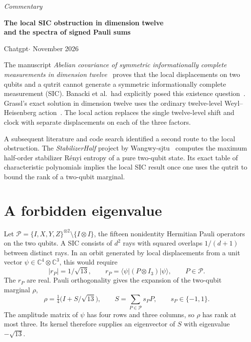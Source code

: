 \documentclass[11pt,a4paper]{article}
\newcommand{\C}{\mathbb C}
\newcommand{\Pset}{\mathcal P}
\begin{document}
\begin{center}
{\large\itshape Commentary}\par\smallskip
{\LARGE\bfseries The local SIC obstruction in dimension twelve\\[2pt]
and the spectra of signed Pauli sums}\par\medskip
Chatgpt\quad$\cdot$ November 2026
\end{center}

The manuscript \emph{Abelian covariance of symmetric informationally complete measurements in dimension twelve}~\cite{sic} proves that the local displacements on two qubits and a qutrit cannot generate a symmetric informationally complete measurement (SIC). Banacki et al.\ had explicitly posed this existence question~\cite[Sec.~5.1]{banacki}. Grassl's exact solution in dimension twelve uses the ordinary twelve-level Weyl--Heisenberg action~\cite{grassl}. The local action replaces the single twelve-level shift and clock with separate displacements on each of the three factors.

A subsequent literature and code search identified a second route to the local obstruction. The \emph{StabilizerHalf} project by Wangwy-sjtu~\cite{half} computes the maximum half-order stabilizer R\'enyi entropy of a pure two-qubit state. Its exact table of characteristic polynomials implies the local SIC result once one uses the qutrit to bound the rank of a two-qubit marginal.

\section*{A forbidden eigenvalue}
Let $\Pset=\{I,X,Y,Z\}^{\otimes2}\setminus\{I\otimes I\}$, the fifteen nonidentity Hermitian Pauli operators on the two qubits. A SIC consists of $d^2$ rays with squared overlaps $1/(d+1)$ between distinct rays. In an orbit generated by local displacements from a unit vector $\psi\in\C^4\otimes\C^3$, this would require
\[
  |r_P|=1/\sqrt{13},\qquad
  r_P=\langle\psi|(P\otimes I_3)|\psi\rangle,\qquad P\in\Pset.
\]
The $r_P$ are real. Pauli orthogonality gives the expansion of the two-qubit marginal $\rho$,
\[
  \rho=\tfrac14\bigl(I+S/\sqrt{13}\bigr),\qquad
  S=\sum_{P\in\Pset}s_PP,\qquad s_P\in\{-1,1\}.
\]
The amplitude matrix of $\psi$ has four rows and three columns, so $\rho$ has rank at most three. Its kernel therefore supplies an eigenvector of $S$ with eigenvalue $-\sqrt{13}$.
\end{document}
